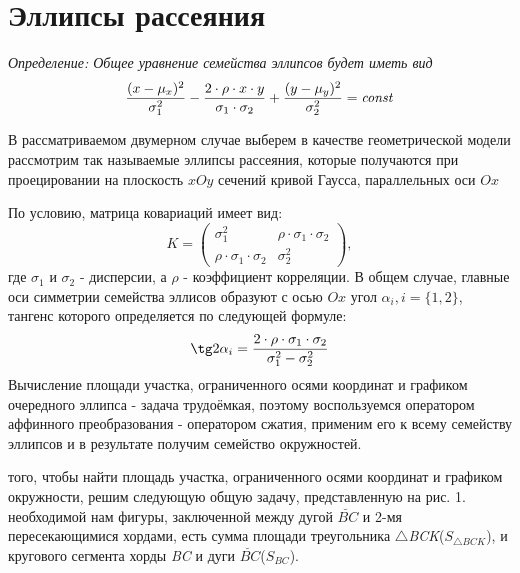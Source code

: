 \section{Эллипсы рассеяния}
{\it Определение: Общее уравнение семейства эллипсов будет иметь вид\/}
$${(x-\mu_x)^2\over \sigma_1^2} - {2\cdot \rho\cdot x\cdot y\over \sigma_1\cdot \sigma_2} + {(y-\mu_y)^2\over \sigma_2^2} = \it{const}$$

В рассматриваемом двумерном случае выберем в качестве геометрической модели рассмотрим так называемые эллипсы рассеяния, которые получаются при проецировании на плоскость $xOy$ сечений кривой Гаусса, параллельных оси $Ox$
\begin{figure}[h]
\begin{minipage}[h]{0.49\linewidth}
\end{minipage}
\begin{minipage}[h]{0.49\linewidth}
\end{minipage}
\end{figure}
По условию, матрица ковариаций имеет вид:
$$ K = \left( 
\begin{matrix}
\sigma_1^2 & \rho\cdot\sigma_1\cdot\sigma_2 \\ \rho\cdot\sigma_1\cdot\sigma_2 & \sigma_2^2
\end{matrix}
\right),$$
где $\sigma_1$ и $\sigma_2$ - дисперсии, а $\rho$ - коэффициент корреляции.
В общем случае, главные оси симметрии семейства эллисов образуют с осью $Ox$ угол $\alpha_i, i =\{1,2\}$, тангенс которого определяется по следующей формуле:
$$\tg2\alpha_i={ 2\cdot \rho\cdot \sigma_1\cdot \sigma_2\over \sigma_1^2 - \sigma_2^2}$$
Вычисление площади участка, ограниченного осями координат и графиком очередного эллипса - задача трудоёмкая, поэтому воспользуемся оператором аффинного преобразования - оператором сжатия, применим его к всему семейству эллипсов и в результате получим семейство окружностей.
\begin{figure}[h!]
\begin{minipage}[h!]{0.49\linewidth}
\end{minipage}
\begin{minipage}[h!]{0.49\linewidth}
\end{minipage}
\end{figure}
 того, чтобы найти площадь участка, ограниченного осями координат и графиком окружности, решим следующую общую задачу, представленную на рис. 1.
 необходимой нам фигуры, заключенной между дугой $\breve{BC}$ и 2-мя пересекающимися хордами, есть сумма площади треугольника $\triangle${\it BCK}($S_{\triangle BCK}$), и кругового сегмента хорды {\it BC} и дуги $\breve{BC}$($S_{BC}$).
